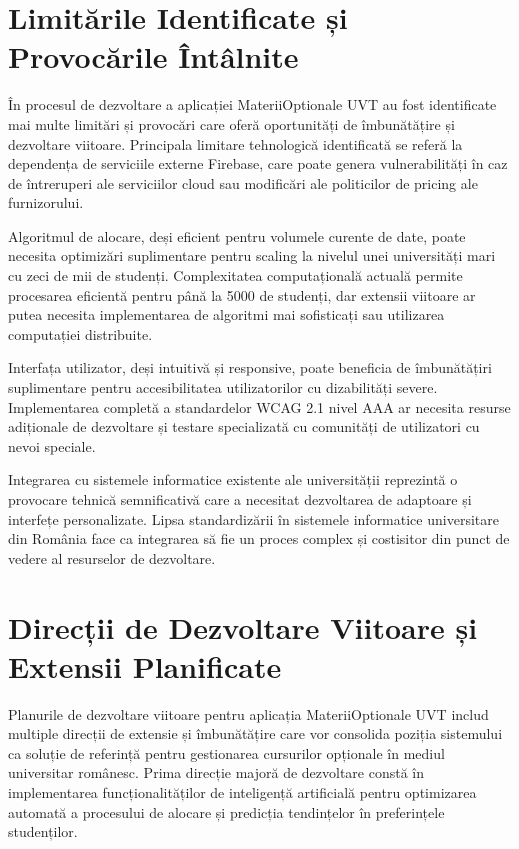 \documentclass[12pt,a4paper]{report}
\begin{document}
\section{Limitările Identificate și Provocările Întâlnite}

În procesul de dezvoltare a aplicației MateriiOptionale UVT au fost identificate mai multe limitări și provocări care oferă oportunități de îmbunătățire și dezvoltare viitoare. Principala limitare tehnologică identificată se referă la dependența de serviciile externe Firebase, care poate genera vulnerabilități în caz de întreruperi ale serviciilor cloud sau modificări ale politicilor de pricing ale furnizorului.

Algoritmul de alocare, deși eficient pentru volumele curente de date, poate necesita optimizări suplimentare pentru scaling la nivelul unei universități mari cu zeci de mii de studenți. Complexitatea computațională actuală permite procesarea eficientă pentru până la 5000 de studenți, dar extensii viitoare ar putea necesita implementarea de algoritmi mai sofisticați sau utilizarea computației distribuite.

Interfața utilizator, deși intuitivă și responsive, poate beneficia de îmbunătățiri suplimentare pentru accesibilitatea utilizatorilor cu dizabilități severe. Implementarea completă a standardelor WCAG 2.1 nivel AAA \cite{accessibility-wcag} ar necesita resurse adiționale de dezvoltare și testare specializată cu comunități de utilizatori cu nevoi speciale.

Integrarea cu sistemele informatice existente ale universității reprezintă o provocare tehnică semnificativă care a necesitat dezvoltarea de adaptoare și interfețe personalizate. Lipsa standardizării în sistemele informatice universitare din România face ca integrarea să fie un proces complex și costisitor din punct de vedere al resurselor de dezvoltare.

\section{Direcții de Dezvoltare Viitoare și Extensii Planificate}

Planurile de dezvoltare viitoare pentru aplicația MateriiOptionale UVT includ multiple direcții de extensie și îmbunătățire care vor consolida poziția sistemului ca soluție de referință pentru gestionarea cursurilor opționale în mediul universitar românesc. Prima direcție majoră de dezvoltare constă în implementarea funcționalităților de inteligență artificială pentru optimizarea automată a procesului de alocare și predicția tendințelor în preferințele studenților.
\end{document}
